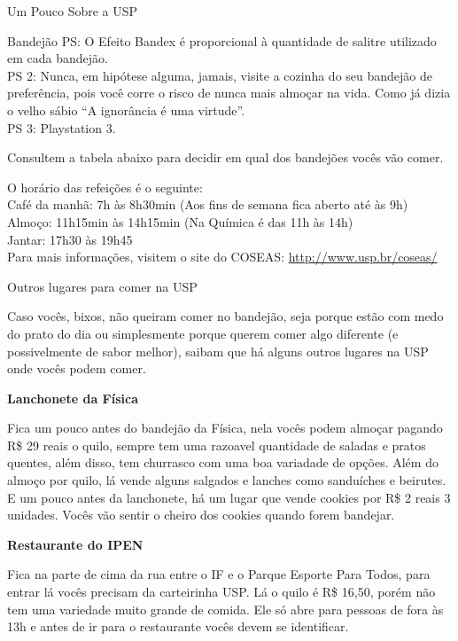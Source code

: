 \begin{secao}{Um Pouco Sobre a USP}
\begin{subsecao}{Bandejão}
PS: O Efeito Bandex é proporcional à quantidade de salitre utilizado em cada bandejão.\\
PS 2: Nunca, em hipótese alguma, jamais, visite a cozinha do seu bandejão de preferência,
pois você corre o risco de nunca mais almoçar na vida. Como já dizia o velho sábio ``A
ignorância é uma virtude''.\\
PS 3: Playstation 3.

Consultem a tabela abaixo para decidir em qual dos bandejões vocês vão comer.

O horário das refeições é o seguinte:\\
Café da manhã: 7h às 8h30min (Aos fins de semana fica aberto até às 9h)\\
Almoço: 11h15min às 14h15min (Na Química é das 11h às 14h)\\
Jantar: 17h30 às 19h45\\

Para mais informações, visitem o site do COSEAS: \href{http://www.usp.br/coseas/COSEASHP/COSEAS2010_restaurantes.html}{http://www.usp.br/coseas/}
\pagebreak

\end{subsecao}

\begin{subsecao}{Outros lugares para comer na USP}

Caso vocês, bixos, não queiram comer no bandejão, seja porque estão com medo do prato do dia
ou simplesmente porque querem comer algo diferente (e possivelmente de sabor melhor), saibam
que há alguns outros lugares na USP onde vocês podem comer.

{\bf Lanchonete da Física}

Fica um pouco antes do bandejão da Física, nela vocês podem almoçar pagando R\$ 29 reais o
quilo, sempre tem uma razoavel quantidade de saladas e pratos quentes, além disso, tem
churrasco com uma boa variadade de opções. 
Além do almoço por quilo, lá vende alguns salgados e lanches como sanduíches e beirutes.
E um pouco antes da lanchonete, há um lugar que vende cookies por R\$ 2 reais 3 unidades.
Vocês vão sentir o cheiro dos cookies quando forem bandejar.

{\bf Restaurante do IPEN}

Fica na parte de cima da rua entre o IF e o Parque Esporte Para Todos, para entrar lá vocês
precisam da carteirinha USP. Lá o quilo é R\$ 16,50, porém não tem uma variedade muito grande
de comida. Ele só abre para pessoas de fora às 13h e antes de ir para o restaurante vocês devem
se identificar.


\end{subsecao}
\end{secao}

